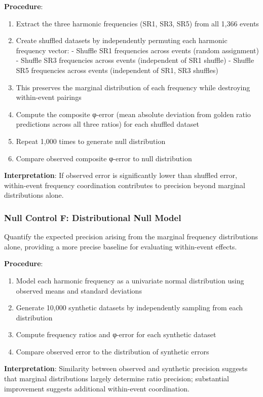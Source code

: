 \documentclass[11pt,a4paper]{article}
\begin{document}
\textbf{Procedure}:
\begin{enumerate}
\item Extract the three harmonic frequencies (SR1, SR3, SR5) from all 1,366 events
\item Create shuffled datasets by independently permuting each harmonic frequency vector:   - Shuffle SR1 frequencies across events (random assignment)   - Shuffle SR3 frequencies across events (independent of SR1 shuffle)   - Shuffle SR5 frequencies across events (independent of SR1, SR3 shuffles)
\item This preserves the marginal distribution of each frequency while destroying within-event pairings
\item Compute the composite φ-error (mean absolute deviation from golden ratio predictions across all three ratios) for each shuffled dataset
\item Repeat 1,000 times to generate null distribution
\item Compare observed composite φ-error to null distribution
\end{enumerate}

\textbf{Interpretation}: If observed error is significantly lower than shuffled error, within-event frequency coordination contributes to precision beyond marginal distributions alone.

\subsubsection{Null Control F: Distributional Null Model}
Quantify the expected precision arising from the marginal frequency distributions alone, providing a more precise baseline for evaluating within-event effects.

\textbf{Procedure}:
\begin{enumerate}
\item Model each harmonic frequency as a univariate normal distribution using observed means and standard deviations
\item Generate 10,000 synthetic datasets by independently sampling from each distribution
\item Compute frequency ratios and φ-error for each synthetic dataset
\item Compare observed error to the distribution of synthetic errors
\end{enumerate}

\textbf{Interpretation}: Similarity between observed and synthetic precision suggests that marginal distributions largely determine ratio precision; substantial improvement suggests additional within-event coordination.
\end{document}
